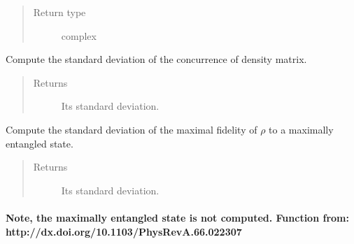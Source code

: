 \documentclass[letterpaper,10pt,english]{sphinxmanual}
\begin{document}
\begin{fulllineitems}
\begin{fulllineitems}
\begin{quote}
\begin{description}
\item[{Return type}] \leavevmode
complex

\end{description}\end{quote}

\end{fulllineitems}


\begin{fulllineitems}
\label{modules:Tomography.Errorize.concurrence}
Compute the standard deviation of the concurrence of density matrix.
\begin{quote}\begin{description}
\item[{Returns}] \leavevmode
Its standard deviation.

\end{description}\end{quote}

\end{fulllineitems}


\begin{fulllineitems}
\label{modules:Tomography.Errorize.fidelity_max}
Compute the standard deviation of the maximal fidelity of \(\rho\) to a maximally entangled state.
\begin{quote}\begin{description}
\item[{Returns}] \leavevmode
Its standard deviation.

\end{description}\end{quote}
\paragraph{Note, the maximally entangled state is not computed.
Function from: http://dx.doi.org/10.1103/PhysRevA.66.022307}

\end{fulllineitems}



\end{fulllineitems}
\end{document}
